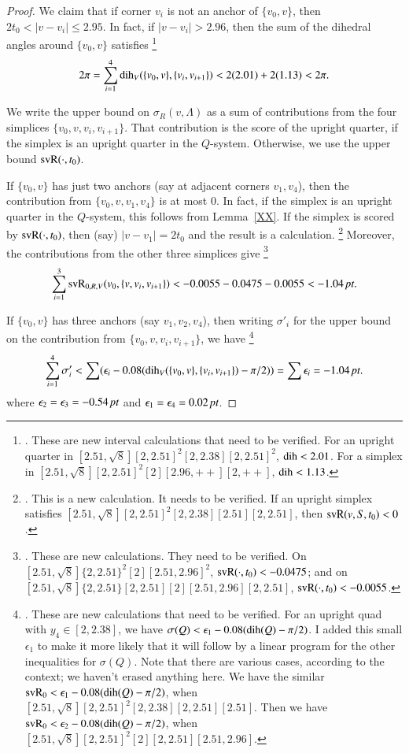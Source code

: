 \begin{proof}
We claim that if corner $v_i$ is not an anchor of $\{v_0,v\}$,
then $2t_0 < |v-v_i| \le 2.95$.  In fact, if $|v-v_i| > 2.96$,
then the sum of the dihedral angles around $\{v_0,v\}$ satisfies%
\footnote{.  These are new interval calculations 
  that need to be verified.  For an upright quarter in
  $[2.51,\sqrt8][2,2.51]^2[2,2.38][2,2.51]^2$, $\operatorname{dih} < 2.01$.
For a simplex in $[2.51,\sqrt8][2,2.51]^2 [2] [2.96,++][2,++]$,
$\operatorname{dih} < 1.13$.}
 $$
 2\pi = \sum_{i=1}^4 \operatorname{dih}_V(\{v_0,v\},\{v_i,v_{i+1}\}) < 2(2.01)+2(1.13) < 2\pi.
 $$

We write the upper bound on $\sigma_R(v,\Lambda)$ 
as a sum of contributions from the four simplices
$\{v_0,v,v_i,v_{i+1}\}$.    That contribution is the score of the
upright quarter, if the simplex is an upright quarter in the $Q$-system.
Otherwise, we use the upper bound ${\operatorname{svR}}(\cdot,t_0)$.

If $\{v_0,v\}$ has just two anchors (say at adjacent corners $v_1,v_4$),
then the contribution from $\{v_0,v,v_1,v_4\}$ is at most $0$.  In
fact, if the simplex is an upright quarter in the $Q$-system, this
follows from Lemma~\ref{XX}.  If the simplex is scored by ${\operatorname{svR}}(\cdot,t_0)$,
then (say) $|v-v_1|=2t_0$ and the result is a calculation.%
\footnote{.  This is a new calculation.  
It needs to be verified.  If an upright
simplex satisfies $[2.51,\sqrt8][2,2.51]^2[2,2.38][2.51][2,2.51]$,
then ${\operatorname{svR}}(v,S,t_0) < 0$.}  Moreover, the contributions from the other
three simplices give%
\footnote{. These are new calculations.  They need
to be verified.  On
$[2.51,\sqrt8]\{2,2.51\}^2[2][2.51,2.96]^2$, ${\operatorname{svR}}(\cdot,t_0) < -0.0475$; and
on $[2.51,\sqrt8]\{2,2.51\}[2,2.51][2][2.51,2.96][2,2.51]$,
   ${\operatorname{svR}}(\cdot,t_0) < -0.0055$.
}
 $$\sum_{i=1}^3{\operatorname{svR}}_{0,R,V}(v_0,\{v,v_i,v_{i+1}\}) <
   -0.0055 - 0.0475 - 0.0055 < -1.04\,\hbox{\it pt}.$$

If $\{v_0,v\}$ has three anchors (say $v_1,v_2,v_4$), then
writing $\sigma'_i$ for the upper bound on the contribution
from $\{v_0,v,v_i,v_{i+1}\}$, we have%
\footnote{.  These are new calculations that need to
be verified.  For an upright quad with $y_4\in[2,2.38]$, we
have $\sigma(Q) < \epsilon_1 -0.08(\operatorname{dih}(Q)-\pi/2)$.  I added
this small $\epsilon_1$ to make it more likely that it will follow
by a linear program for the other inequalities for $\sigma(Q)$.
Note that there are various cases, according to the context; we
haven't erased anything here.  We have the similar
  ${\operatorname{svR}}_0 < \epsilon_1 -0.08(\operatorname{dih}(Q)-\pi/2)$,
when $[2.51,\sqrt8][2,2.51]^2[2,2.38][2,2.51][2.51]$.  Then we
have ${\operatorname{svR}}_0 < \epsilon_2  -0.08(\operatorname{dih}(Q)-\pi/2)$,
when $[2.51,\sqrt8][2,2.51]^2[2][2,2.51][2.51,2.96]$.
}
  $$
  \sum_{i=1}^4\sigma'_i < 
  \sum (\epsilon_i -0.08 (\operatorname{dih}_V(\{v_0,v\},\{v_i,v_{i+1}\})-\pi/2))
  = \sum\epsilon_i = -1.04\,\hbox{\it pt}.
  $$
where $\epsilon_2=\epsilon_3 = -0.54\,\hbox{\it pt}$ and $\epsilon_1=\epsilon_4 =
0.02\,\hbox{\it pt}$.
\end{proof}

